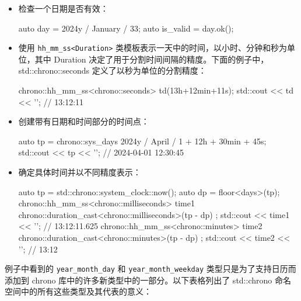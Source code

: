 \begin{itemize}
\item
检查一个日期是否有效：

\begin{cpp}
auto day = 2024y / January / 33;
auto is_valid = day.ok();
\end{cpp}

\item
使用 \verb|hh_mm_ss<Duration>| 类模板表示一天中的时间，以小时、分钟和秒为单位，其中 Duration 决定了用于分割时间间隔的精度。下面的例子中，std::chrono::seconds 定义了以秒为单位的分割精度：

\begin{cpp}
chrono::hh_mm_ss<chrono::seconds> td(13h+12min+11s);
std::cout << td << '\n';  // 13:12:11
\end{cpp}

\item
创建带有日期和时间部分的时间点：

\begin{cpp}
auto tp = chrono::sys_days{ 2024y / April / 1 } + 12h + 30min + 45s;
std::cout << tp << '\n';  // 2024-04-01 12:30:45
\end{cpp}

\item
确定具体时间并以不同精度表示：

\begin{cpp}
auto tp = std::chrono::system_clock::now();
auto dp = floor<days>(tp);
chrono::hh_mm_ss<chrono::milliseconds> time1 {
    chrono::duration_cast<chrono::milliseconds>(tp - dp) };
std::cout << time1 << '\n';  // 13:12:11.625
chrono::hh_mm_ss<chrono::minutes> time2 {
    chrono::duration_cast<chrono::minutes>(tp - dp) };
std::cout << time2 << '\n';  // 13:12
\end{cpp}

\end{itemize}


例子中看到的 \verb|year_month_day| 和 \verb|year_month_weekday| 类型只是为了支持日历而添加到 chrono 库中的许多新类型中的一部分。以下表格列出了 std::chrono 命名空间中的所有这些类型及其代表的意义：

